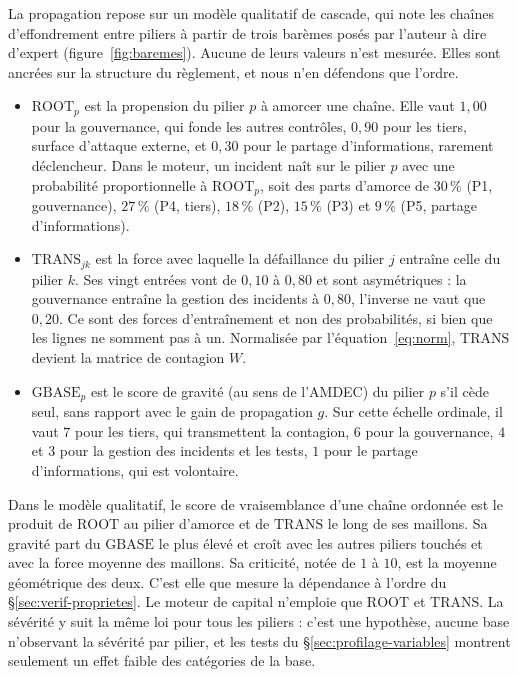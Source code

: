 La propagation repose sur un modèle qualitatif de cascade, qui note les chaînes d'effondrement
entre piliers à partir de trois barèmes posés par l'auteur à dire d'expert
(figure~\ref{fig:baremes}). Aucune de leurs valeurs n'est mesurée. Elles sont ancrées sur la
structure du règlement, et nous n'en défendons que l'ordre.
\begin{itemize}[leftmargin=*,itemsep=2pt]
\item $\mathrm{ROOT}_p$ est la propension du pilier $p$ à amorcer une chaîne. Elle vaut $1{,}00$
  pour la gouvernance, qui fonde les autres contrôles, $0{,}90$ pour les tiers, surface d'attaque
  externe, et $0{,}30$ pour le partage d'informations, rarement déclencheur. Dans le moteur, un
  incident naît sur le pilier $p$ avec une probabilité proportionnelle à $\mathrm{ROOT}_p$, soit
  des parts d'amorce de $30\,\%$ (P1, gouvernance), $27\,\%$ (P4, tiers), $18\,\%$ (P2), $15\,\%$
  (P3) et $9\,\%$ (P5, partage d'informations).
\item $\mathrm{TRANS}_{jk}$ est la force avec laquelle la défaillance du pilier $j$ entraîne celle
  du pilier $k$. Ses vingt entrées vont de $0{,}10$ à $0{,}80$ et sont asymétriques : la
  gouvernance entraîne la gestion des incidents à $0{,}80$, l'inverse ne vaut que $0{,}20$. Ce
  sont des forces d'entraînement et non des probabilités, si bien que les lignes ne somment pas à
  un. Normalisée par l'équation~\eqref{eq:norm}, $\mathrm{TRANS}$ devient la matrice de contagion
  $W$.
\item $\mathrm{GBASE}_p$ est le score de gravité (au sens de l'AMDEC) du pilier $p$ s'il cède seul,
  sans rapport avec le gain de propagation $g$. Sur cette échelle ordinale, il vaut $7$ pour les tiers, qui transmettent la contagion, $6$ pour la gouvernance, $4$ et
  $3$ pour la gestion des incidents et les tests, $1$ pour le partage d'informations, qui est
  volontaire.
\end{itemize}
Dans le modèle qualitatif, le score de vraisemblance d'une chaîne ordonnée est le produit de $\mathrm{ROOT}$
au pilier d'amorce et de $\mathrm{TRANS}$ le long de ses maillons. Sa gravité part du
$\mathrm{GBASE}$ le plus élevé et croît avec les autres piliers touchés et avec la force moyenne des
maillons. Sa criticité, notée de $1$ à $10$, est la moyenne géométrique des deux. C'est elle que
mesure la dépendance à l'ordre du \S\ref{sec:verif-proprietes}. Le moteur de capital n'emploie que
$\mathrm{ROOT}$ et $\mathrm{TRANS}$. La sévérité y suit la même loi pour tous les piliers : c'est
une hypothèse, aucune base n'observant la sévérité par pilier, et les tests du
\S\ref{sec:profilage-variables} montrent seulement un effet faible des catégories de la base.

